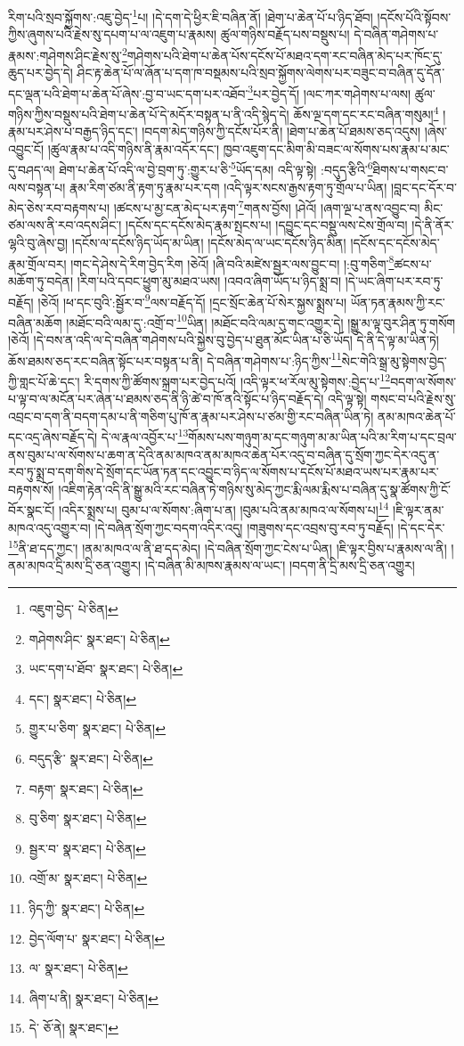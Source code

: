རིག་པའི་སྲབ་སྐྱོགས་:འཇུ་བྱེད་\footnote{འཇུག་བྱེད་  པེ་ཅིན། }པ། །དེ་དག་དེ་ཕྱིར་ཇི་བཞིན་ནོ། །ཐེག་པ་ཆེན་པོ་པ་ཉིད་ཐོབ། །དངོས་པོའི་སྟོབས་ཀྱིས་ཞུགས་པའི་རྗེས་སུ་དཔག་པ་ལ་འཇུག་པ་རྣམས། ཚུལ་གཉིས་བརྗོད་པས་བསྡུས་པ། དེ་བཞིན་གཤེགས་པ་རྣམས་:གཤེགས་ཤིང་རྗེས་སུ་\footnote{གཤེགས་ཤིང་  སྣར་ཐང་།  པེ་ཅིན། }གཤེགས་པའི་ཐེག་པ་ཆེན་པོས་དངོས་པོ་མཐའ་དག་རང་བཞིན་མེད་པར་ཁོང་དུ་ཆུད་པར་བྱེད་དེ། ཤིང་རྟ་ཆེན་པོ་ལ་ཞོན་པ་དག་ཁ་བསྡམས་པའི་སྲབ་སྐྱོགས་ལེགས་པར་བཟུང་བ་བཞིན་དུ་དོན་དང་ལྡན་པའི་ཐེག་པ་ཆེན་པོ་ཞེས་:བྱ་བ་ཡང་དག་པར་འཐོབ་\footnote{ཡང་དག་པ་ཐོབ་  སྣར་ཐང་།  པེ་ཅིན། }པར་བྱེད་དོ། །ལང་ཀར་གཤེགས་པ་ལས། ཚུལ་གཉིས་ཀྱིས་བསྡུས་པའི་ཐེག་པ་ཆེན་པོ་དེ་མདོར་བསྟན་པ་ནི་འདི་སྙེད་དེ། ཆོས་ལྔ་དག་དང་རང་བཞིན་གསུམ།\footnote{དང་།  སྣར་ཐང་།  པེ་ཅིན། } །རྣམ་པར་ཤེས་པ་བརྒྱད་ཉིད་དང་། །བདག་མེད་གཉིས་ཀྱི་དངོས་པོར་ནི། །ཐེག་པ་ཆེན་པོ་ཐམས་ཅད་འདུས། །ཞེས་འབྱུང་ངོ། །ཚུལ་རྣམ་པ་འདི་གཉིས་ནི་རྣམ་འདོར་དང་། ཁྱབ་འཇུག་དང་མིག་མི་བཟང་ལ་སོགས་པས་རྣམ་པ་མང་དུ་བཤད་ལ། ཐེག་པ་ཆེན་པོ་འདི་ལ་བྱེ་བྲག་ཏུ་:གྱུར་པ་ཅི་\footnote{གྱུར་པ་ཅིག་  སྣར་ཐང་།  པེ་ཅིན། }ཡོད་དམ། འདི་ལྟ་སྟེ། :བདུད་རྩིའི་\footnote{བདུད་རྩི་  སྣར་ཐང་།  པེ་ཅིན། }ཐིགས་པ་གསང་བ་ལས་བསྟན་པ། རྣམ་རིག་ཙམ་ནི་རྟག་ཏུ་རྣམ་པར་དག །འདི་ལྟར་སངས་རྒྱས་རྟག་ཏུ་གྲོལ་པ་ཡིན། །བླང་དང་དོར་བ་མེད་ཅེས་རབ་བརྟགས་པ། །ཚངས་པ་མྱ་ངན་མེད་པར་རྟག་\footnote{བརྟག་  སྣར་ཐང་།  པེ་ཅིན། }གནས་བྱོས། །ཤེའོ། །ཞག་ལྔ་པ་ནས་འབྱུང་བ། མིང་ཙམ་ལས་ནི་རབ་འདས་ཤིང་། །དངོས་དང་དངོས་མེད་རྣམ་སྤངས་པ། །དབྱུང་དང་བསྡུ་ལས་ངེས་གྲོལ་བ། །དེ་ནི་ནོར་ལྷའི་བུ་ཞེས་བྱ། །དངོས་ལ་དངོས་ཉིད་ཡོད་མ་ཡིན། །དངོས་མེད་ལ་ཡང་དངོས་ཉིད་མིན། །དངོས་དང་དངོས་མེད་རྣམ་གྲོལ་བར། །གང་དེ་ཤེས་དེ་རིག་བྱེད་རིག །ཅེའོ། །ཞི་བའི་མཛེས་སྦྱར་ལས་བྱུང་བ། །:བུ་གཅིག་\footnote{བུ་ཅིག་  སྣར་ཐང་།  པེ་ཅིན། }ཚངས་པ་མཆོག་ཏུ་བདེན། །རིག་པའི་དབང་ཕྱུག་མུ་མཐའ་ཡས། །འབའ་ཞིག་ཡོད་པ་ཉིད་སྨྲ་བ། །དེ་ཡང་ཞིག་པར་རབ་ཏུ་བརྗོད། །ཅེའོ། །ཕ་དང་བུའི་:སྦྱོར་བ་\footnote{སྦྱར་བ་  སྣར་ཐང་།  པེ་ཅིན། }ལས་བརྗོད་དོ། །དྲང་སྲོང་ཆེན་པོ་སེར་སྐྱས་སྨྲས་པ། ཡོན་ཏན་རྣམས་ཀྱི་རང་བཞིན་མཆོག །མཐོང་བའི་ལམ་དུ་:འགྲོ་བ་\footnote{འགྲོ་མ་  སྣར་ཐང་།  པེ་ཅིན། }ཡིན། །མཐོང་བའི་ལམ་དུ་གང་འགྱུར་དེ། །སྒྱུ་མ་ལྟ་བུར་ཤིན་ཏུ་གསོག །ཅེའོ། །དེ་བས་ན་འདི་ལ་དེ་བཞིན་གཤེགས་པའི་སྐྱེས་བུ་བྱེད་པ་ཐུན་མོང་ཡིན་པ་ཅི་ཡོད། དེ་ནི་དེ་ལྟ་མ་ཡིན་ཏེ། ཆོས་ཐམས་ཅད་རང་བཞིན་སྟོང་པར་བསྟན་པ་ནི། དེ་བཞིན་གཤེགས་པ་:ཉིད་ཀྱིས་\footnote{ཉིད་ཀྱི་  སྣར་ཐང་།  པེ་ཅིན། }སེང་གེའི་སྒྲ་མུ་སྟེགས་བྱེད་ཀྱི་གླང་པོ་ཆེ་དང་། རི་དགས་ཀྱི་ཚོགས་སྐྲག་པར་བྱེད་པའོ། །འདི་ལྟར་ཕ་རོལ་མུ་སྟེགས་:བྱེད་པ་\footnote{བྱེད་ལོག་པ་  སྣར་ཐང་།  པེ་ཅིན། }བདག་ལ་སོགས་པ་ལྟ་བ་ལ་མངོན་པར་ཞེན་པ་ཐམས་ཅད་ནི་ཉི་ཚེ་བ་ཁོ་ནའི་སྟོང་པ་ཉིད་བརྗོད་དེ། འདི་ལྟ་སྟེ། གསང་བ་པའི་རྗེས་སུ་འབྲང་བ་དག་ནི་བདག་དམ་པ་ནི་གཅིག་པུ་ཁོ་ན་རྣམ་པར་ཤེས་པ་ཙམ་གྱི་རང་བཞིན་ཡིན་ཏེ། ནམ་མཁའ་ཆེན་པོ་དང་འདྲ་ཞེས་བརྗོད་དེ། དེ་ལ་རྣལ་འབྱོར་པ་\footnote{ལ་  སྣར་ཐང་།  པེ་ཅིན། }གོམས་པས་གཉུག་མ་དང་གཉུག་མ་མ་ཡིན་པའི་མ་རིག་པ་དང་བྲལ་ནས་བུམ་པ་ལ་སོགས་པ་ཆག་ན་དེའི་ནམ་མཁའ་ནམ་མཁའ་ཆེན་པོར་འདུ་བ་བཞིན་དུ་སྲོག་ཀྱང་དེར་འདུ་ན་རབ་ཏུ་སྨྲ་བ་དག་གིས་དེ་སྲོག་དང་ཡོན་ཏན་དང་འབྱུང་བ་ཉིད་ལ་སོགས་པ་དངོས་པོ་མཐའ་ཡས་པར་རྣམ་པར་བརྟགས་སོ། །འཇིག་རྟེན་འདི་ནི་སྒྱུ་མའི་རང་བཞིན་ཏེ་གཉིས་སུ་མེད་ཀྱང་རྨི་ལམ་རྨིས་པ་བཞིན་དུ་སྣ་ཚོགས་ཀྱི་ངོ་བོར་སྣང་ངོ། །འདིར་སྨྲས་པ། བུམ་པ་ལ་སོགས་:ཞིག་པ་ན། །བུམ་པའི་ནམ་མཁའ་ལ་སོགས་པ།\footnote{ཞིག་པ་ནི།  སྣར་ཐང་།  པེ་ཅིན། } །ཇི་ལྟར་ནམ་མཁའ་འདུ་འགྱུར་བ། །དེ་བཞིན་སྲོག་ཀྱང་བདག་འདིར་འདུ། །གཟུགས་དང་འབྲས་བུ་རབ་ཏུ་བརྗོད། །དེ་དང་དེར་\footnote{དེ་  ཅོ་ནེ།  སྣར་ཐང་། }ནི་ཐ་དད་ཀྱང་། །ནམ་མཁའ་ལ་ནི་ཐ་དད་མེད། །དེ་བཞིན་སྲོག་ཀྱང་ངེས་པ་ཡིན། །ཇི་ལྟར་བྱིས་པ་རྣམས་ལ་ནི། །ནམ་མཁའ་དྲི་མས་དྲི་ཅན་འགྱུར། །དེ་བཞིན་མི་མཁས་རྣམས་ལ་ཡང་། །བདག་ནི་དྲི་མས་དྲི་ཅན་འགྱུར། 
